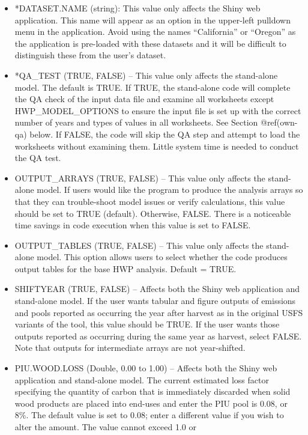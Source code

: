 \documentclass[
  openany]{book}
\begin{document}
\begin{itemize}
\item
  *DATASET.NAME (string): This value only affects the Shiny web
  application. This name will appear as an option in the upper-left
  pulldown menu in the application. Avoid using the names ``California''
  or ``Oregon'' as the application is pre-loaded with these datasets and
  it will be difficult to distinguish these from the user's dataset.
\item
  *QA\_TEST (TRUE, FALSE) -- This value only affects the stand-alone
  model. The default is TRUE. If TRUE, the stand-alone code will
  complete the QA check of the input data file and examine all
  worksheets except HWP\_MODEL\_OPTIONS to ensure the input file is set
  up with the correct number of years and types of values in all
  worksheets. See Section @ref(own-qa) below. If FALSE, the code will
  skip the QA step and attempt to load the worksheets without examining
  them. Little system time is needed to conduct the QA test.
\item
  OUTPUT\_ARRAYS (TRUE, FALSE) -- This value only affects the
  stand-alone model. If users would like the program to produce the
  analysis arrays so that they can trouble-shoot model issues or verify
  calculations, this value should be set to TRUE (default). Otherwise,
  FALSE. There is a noticeable time savings in code execution when this
  value is set to FALSE.
\item
  OUTPUT\_TABLES (TRUE, FALSE) -- This value only affects the
  stand-alone model. This option allows users to select whether the code
  produces output tables for the base HWP analysis. Default = TRUE.
\item
  SHIFTYEAR (TRUE, FALSE) -- Affects both the Shiny web application and
  stand-alone model. If the user wants tabular and figure outputs of
  emissions and pools reported as occurring the year after harvest as in
  the original USFS variants of the tool, this value should be TRUE. If
  the user wants those outputs reported as occurring during the same
  year as harvest, select FALSE. Note that outputs for intermediate
  arrays are not year-shifted.
\item
  PIU.WOOD.LOSS (Double, 0.00 to 1.00) -- Affects both the Shiny web
  application and stand-alone model. The current estimated loss factor
  specifying the quantity of carbon that is immediately discarded when
  solid wood products are placed into end-uses and enter the PIU pool is
  0.08, or 8\%. The default value is set to 0.08; enter a different
  value if you wish to alter the amount. The value cannot exceed 1.0 or

\end{itemize}
\end{document}

